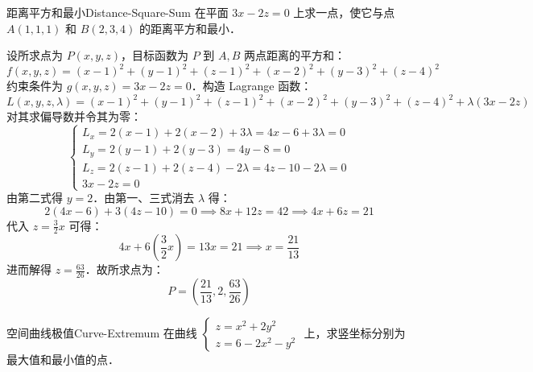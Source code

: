 \begin{problem}{距离平方和最小}{Distance-Square-Sum}
    在平面 $3x - 2z = 0$ 上求一点，使它与点 $A(1, 1, 1)$ 和 $B(2, 3, 4)$ 的距离平方和最小．
\end{problem}

\begin{solution}
    设所求点为 $P(x, y, z)$，目标函数为 $P$ 到 $A, B$ 两点距离的平方和：
    \begin{equation}
        f(x, y, z) = (x-1)^2 + (y-1)^2 + (z-1)^2 + (x-2)^2 + (y-3)^2 + (z-4)^2
    \end{equation}
    约束条件为 $g(x, y, z) = 3x - 2z = 0$．构造 Lagrange 函数：
    \begin{equation}
        L(x, y, z, \lambda) = (x-1)^2 + (y-1)^2 + (z-1)^2 + (x-2)^2 + (y-3)^2 + (z-4)^2 + \lambda(3x - 2z)
    \end{equation}
    对其求偏导数并令其为零：
    \begin{equation}
        \begin{cases}
            L_x = 2(x-1) + 2(x-2) + 3\lambda = 4x - 6 + 3\lambda = 0  \\
            L_y = 2(y-1) + 2(y-3) = 4y - 8 = 0                        \\
            L_z = 2(z-1) + 2(z-4) - 2\lambda = 4z - 10 - 2\lambda = 0 \\
            3x - 2z = 0
        \end{cases}
    \end{equation}
    由第二式得 $y = 2$．由第一、三式消去 $\lambda$ 得：
    \begin{equation}
        2(4x - 6) + 3(4z - 10) = 0 \implies 8x + 12z = 42 \implies 4x + 6z = 21
    \end{equation}
    代入 $z = \frac{3}{2}x$ 可得：
    \begin{equation}
        4x + 6\left( \frac{3}{2}x \right) = 13x = 21 \implies x = \frac{21}{13}
    \end{equation}
    进而解得 $z = \frac{63}{26}$．故所求点为：
    \begin{equation}
        \boxed{P = \left( \frac{21}{13}, 2, \frac{63}{26} \right)}
    \end{equation}
\end{solution}

\begin{problem}{空间曲线极值}{Curve-Extremum}
    在曲线 $\begin{cases} z = x^2 + 2y^2 \\ z = 6 - 2x^2 - y^2 \end{cases}$ 上，求竖坐标分别为最大值和最小值的点．
\end{problem}

